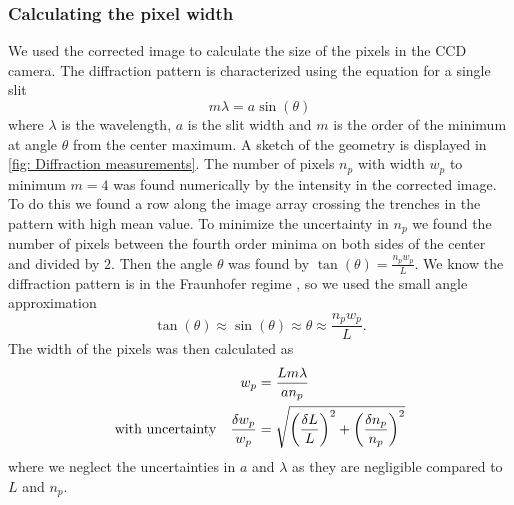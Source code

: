 \documentclass{emulateapj}
\begin{document}
\subsubsection{Calculating the pixel width}
We used the corrected image to calculate the size of the pixels in the CCD camera. The diffraction pattern is characterized using the equation for a single slit \citep{lab1}
\begin{equation}
	m\lambda = a\sin(\theta)
	\label{eq: Single slit diffraction}
\end{equation}
where $\lambda$ is the wavelength, $a$ is the slit width and $m$ is the order of the minimum at angle $\theta$ from the center maximum. A sketch of the geometry is displayed in \cref{fig: Diffraction measurements}. The number of pixels $n_p$ with width $w_p$ to minimum $m=4$ was found numerically by the intensity in the corrected image. To do this we found a row along the image array crossing the trenches in the pattern with high mean value. To minimize the uncertainty in $n_p$ we found the number of pixels between the fourth order minima on both sides of the center and divided by $2$. Then the angle $\theta$ was found by $\tan(\theta) = \frac{n_pw_p}{L}$. We know the diffraction pattern is in the Fraunhofer regime \citep{Fraunhofer}, so we used the small angle approximation
\begin{equation}
	\tan(\theta) \approx \sin(\theta) \approx \theta \approx \frac{n_pw_p}{L}.
	\label{eq: Small angle}
\end{equation}
The width of the pixels was then calculated as
\begin{align}
	w_p &= \frac{Lm\lambda}{an_p} \label{eq: pixel width}
	\\
	\qq*{with uncertainty} \frac{\delta w_p}{w_p} &= \sqrt{\qty(\frac{\delta L}{L})^2+\qty(\frac{\delta n_p}{n_p})^2} \label{eq: pixel width unc}
\end{align}
where we neglect the uncertainties in $a$ and $\lambda$ as they are negligible compared to $L$ and $n_p$.
\end{document}
